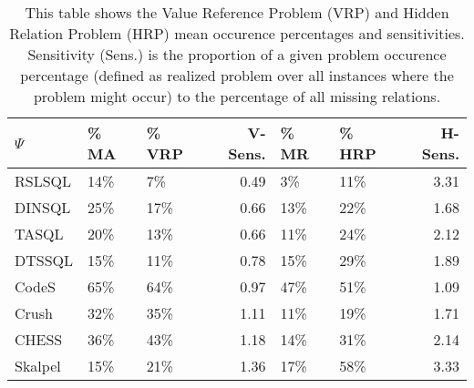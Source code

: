 \begin{table}
\caption{This table shows the Value Reference Problem (VRP) and Hidden Relation Problem (HRP) mean occurence percentages and sensitivities. Sensitivity (Sens.) is the proportion of a given problem occurence percentage (defined as realized problem over all instances where the problem might occur) to the percentage of all missing relations.}
\label{tab:vrp_hrp_sensitivity}
\begin{tabular}{lllrllr}
\toprule
$\Psi$ & \% MA & \% VRP & V-Sens. & \% MR & \% HRP & H-Sens. \\
\midrule
RSLSQL & 14\% & 7\% & 0.49 & 3\% & 11\% & 3.31 \\
DINSQL & 25\% & 17\% & 0.66 & 13\% & 22\% & 1.68 \\
TASQL & 20\% & 13\% & 0.66 & 11\% & 24\% & 2.12 \\
DTSSQL & 15\% & 11\% & 0.78 & 15\% & 29\% & 1.89 \\
CodeS & 65\% & 64\% & 0.97 & 47\% & 51\% & 1.09 \\
Crush & 32\% & 35\% & 1.11 & 11\% & 19\% & 1.71 \\
CHESS & 36\% & 43\% & 1.18 & 14\% & 31\% & 2.14 \\
Skalpel & 15\% & 21\% & 1.36 & 17\% & 58\% & 3.33 \\
\bottomrule
\end{tabular}
\end{table}
